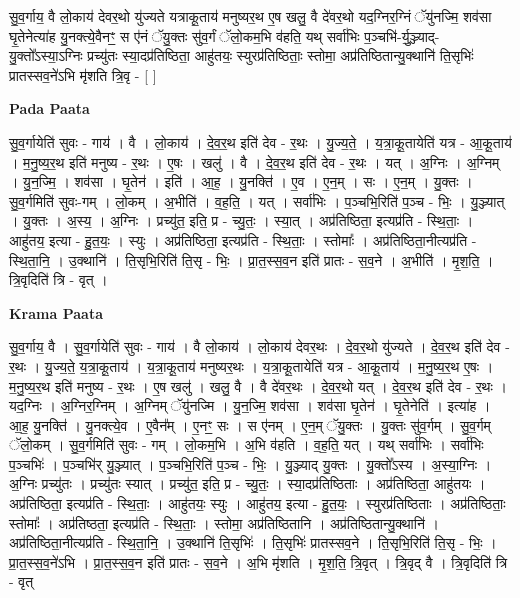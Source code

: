 \documentclass[17pt]{extarticle}
\begin{document}
सु॒व॒र्गाय॒ वै लो॒काय॑ देवर॒थो यु॑ज्यते यत्राकू॒ताय॑ मनुष्यर॒थ ए॒ष खलु॒ वै दे॑वर॒थो यद॒ग्निर॒ग्निं ॅयु॑नज्मि॒ शव॑सा घृ॒तेनेत्या॑ह यु॒नक्त्ये॒वैनꣳ॒॒ स ए॑नं ॅयु॒क्तः सु॑व॒र्गं ॅलो॒कम॒भि व॑हति॒ यथ् सर्वा॑भिः प॒ञ्चभि॑-र्यु॒ञ्ज्याद्-यु॒क्तो᳚ऽस्या॒ऽग्निः प्रच्यु॑तः स्या॒दप्र॑तिष्ठिता॒ आहु॑तयः॒ स्युरप्र॑तिष्ठिताः॒ स्तोमा॒ अप्र॑तिष्ठितान्यु॒क्थानि॑ ति॒सृभिः॑ प्रातस्सव॒ने॑ऽभि मृ॑शति त्रि॒वृ - [  ] \newline

\textbf{Pada Paata} \newline

सु॒व॒र्गायेति॑ सुवः - गाय॑ । वै । लो॒काय॑ । दे॒व॒र॒थ इति॑ देव - र॒थः । यु॒ज्य॒ते॒ । य॒त्रा॒कू॒तायेति॑ यत्र - आ॒कू॒ताय॑ । म॒नु॒ष्य॒र॒थ इति॑ मनुष्य - र॒थः । ए॒षः । खलु॑ । वै । दे॒व॒र॒थ इति॑ देव - र॒थः । यत् । अ॒ग्निः । अ॒ग्निम् । यु॒न॒ज्मि॒ । शव॑सा । घृ॒तेन॑ । इति॑ । आ॒ह॒ । यु॒नक्ति॑ । ए॒व । ए॒न॒म् । सः । ए॒न॒म् । यु॒क्तः । सु॒व॒र्गमिति॑ सुवः-गम् । लो॒कम् । अ॒भीति॑ । व॒ह॒ति॒ । यत् । सर्वा॑भिः । प॒ञ्चभि॒रिति॑ प॒ञ्च - भिः॒ । यु॒ञ्ज्यात् । यु॒क्तः । अ॒स्य॒ । अ॒ग्निः । प्रच्यु॑त॒ इति॒ प्र - च्यु॒तः॒ । स्या॒त् । अप्र॑तिष्ठिता॒ इत्यप्र॑ति - स्थि॒ताः॒ । आहु॑तय॒ इत्या - हु॒त॒यः॒ । स्युः । अप्र॑तिष्ठिता॒ इत्यप्र॑ति - स्थि॒ताः॒ । स्तोमाः᳚ । अप्र॑तिष्ठिता॒नीत्यप्र॑ति - स्थि॒ता॒नि॒ । उ॒क्थानि॑ । ति॒सृभि॒रिति॑ ति॒सृ - भिः॒ । प्रा॒त॒स्स॒व॒न इति॑ प्रातः - स॒व॒ने । अ॒भीति॑ । मृ॒श॒ति॒ । त्रि॒वृदिति॑ त्रि - वृत् ।  \newline


\textbf{Krama Paata} \newline

सु॒व॒र्गाय॒ वै । सु॒व॒र्गायेति॑ सुवः - गाय॑ । वै लो॒काय॑ । लो॒काय॑ देवर॒थः । दे॒व॒र॒थो यु॑ज्यते । दे॒व॒र॒थ इति॑ देव - र॒थः । यु॒ज्य॒ते॒ य॒त्रा॒कू॒ताय॑ । य॒त्रा॒कू॒ताय॑ मनुष्यर॒थः । य॒त्रा॒कू॒तायेति॑ यत्र - आ॒कू॒ताय॑ । म॒नु॒ष्य॒र॒थ ए॒षः । म॒नु॒ष्य॒र॒थ इति॑ मनुष्य - र॒थः । ए॒ष खलु॑ । खलु॒ वै । वै दे॑वर॒थः । दे॒व॒र॒थो यत् । दे॒व॒र॒थ इति॑ देव - र॒थः । यद॒ग्निः । अ॒ग्निर॒ग्निम् । अ॒ग्निम् ॅयु॑नज्मि । यु॒न॒ज्मि॒ शव॑सा । शव॑सा घृ॒तेन॑ । घृ॒तेनेति॑ । इत्या॑ह । आ॒ह॒ यु॒नक्ति॑ । यु॒नक्त्ये॒व । ए॒वैन᳚म् । ए॒नꣳ॒॒ सः । स ए॑नम् । ए॒न॒म् ॅयु॒क्तः । यु॒क्तः सु॑व॒र्गम् । सु॒व॒र्गम् ॅलो॒कम् । सु॒व॒र्गमिति॑ सुवः - गम् । लो॒कम॒भि । अ॒भि व॑हति । व॒ह॒ति॒ यत् । यथ् सर्वा॑भिः । सर्वा॑भिः प॒ञ्चभिः॑ । प॒ञ्चभि॑र् यु॒ञ्ज्यात् । प॒ञ्चभि॒रिति॑ प॒ञ्च - भिः॒ । यु॒ञ्ज्याद् यु॒क्तः । यु॒क्तो᳚ऽस्य । अ॒स्या॒ग्निः । अ॒ग्निः प्रच्यु॑तः । प्रच्यु॑तः स्यात् । प्रच्यु॑त॒ इति॒ प्र - च्यु॒तः॒ । स्या॒दप्र॑तिष्ठिताः । अप्र॑तिष्ठिता॒ आहु॑तयः । अप्र॑तिष्ठिता॒ इत्यप्र॑ति - स्थि॒ताः॒ । आहु॑तयः॒ स्युः । आहु॑तय॒ इत्या - हु॒त॒यः॒ । स्युरप्र॑तिष्ठिताः । अप्र॑तिष्ठिताः॒ स्तोमाः᳚ । अप्र॑तिष्ठता॒ इत्यप्र॑ति - स्थि॒ताः॒ । स्तोमा॒ अप्र॑तिष्ठितानि । अप्र॑तिष्ठितान्यु॒क्थानि॑ । अप्र॑तिष्ठिता॒नीत्यप्र॑ति - स्थि॒ता॒नि॒ । उ॒क्थानि॑ ति॒सृभिः॑ । ति॒सृभिः॑ प्रातस्सव॒ने । ति॒सृभि॒रिति॑ ति॒सृ - भिः॒ । प्रा॒त॒स्स॒व॒ने॑ऽभि । प्रा॒त॒स्स॒व॒न इति॑ प्रातः - स॒व॒ने । अ॒भि मृ॑शति । मृ॒श॒ति॒ त्रि॒वृत् । त्रि॒वृद् वै । त्रि॒वृदिति॑ त्रि - वृत् \newline
\end{document}
